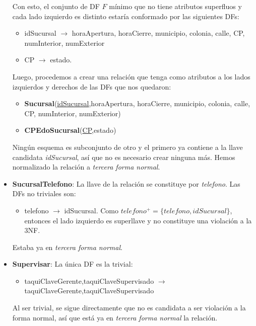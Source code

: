 \documentclass[11pt,letterpaper]{article}
\begin{document}
\begin{itemize}
Con esto, el conjunto de DF $F$ mínimo que no tiene atributos superfluos y cada lado izquierdo es distinto estaría conformado por las siguientes DFs:

\begin{itemize}
\item idSucursal $\rightarrow$ horaApertura, horaCierre, municipio, colonia, calle, CP, numInterior, numExterior
\item CP $\rightarrow$ estado.
\end{itemize} 

Luego, procedemos a crear una relación que tenga como atributos a los lados izquierdos y derechos de las DFs que nos quedaron:

\begin{itemize}
\item {\footnotesize \textbf{Sucursal}(\underline{idSucursal},horaApertura, horaCierre, municipio, colonia, calle, CP, numInterior, numExterior)}
\item {\footnotesize \textbf{CPEdoSucursal}(\underline{CP},estado)}
\end{itemize}

Ningún esquema es subconjunto de otro y el primero ya contiene a la llave candidata \textit{idSucursal}, así que no es necesario crear ninguna más. Hemos normalizado la relación a \textit{tercera forma normal}.

\item \textbf{SucursalTelefono}: La llave de la relación se constituye por \textit{telefono}. Las DFs no triviales son:

\begin{itemize}

\item telefono  $\rightarrow$ idSucursal. Como $telefono^+=\{telefono,idSucursal\}$, entonces el lado izquierdo es superllave y no constituye una violación a la 3NF.

\end{itemize}

Estaba ya en \textit{tercera forma normal}.

\item \textbf{Supervisar}: La única DF es la trivial:

\begin{itemize}
\item taquiClaveGerente,taquiClaveSupervisado $\rightarrow$ taquiClaveGerente,taquiClaveSupervisado
\end{itemize}

Al ser trivial, se sigue directamente que no es candidata a ser violación a la forma normal, así que está ya en \textit{tercera forma normal} la relación. 


\end{itemize}
\end{document}
